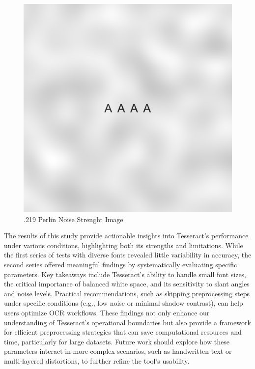 \documentclass[10pt,twocolumn]{article}
\begin{document}
\begin{figure}[h!]
    \centering
    \includegraphics[width=\linewidth]{Figures/Figure_I.png}
    \caption{.219 Perlin Noise Strenght Image}
    \label{fig:FigI}
\end{figure}
The results of this study provide actionable insights into Tesseract's performance under various conditions, highlighting both its strengths and limitations. While the first series of tests with diverse fonts revealed little variability in accuracy, the second series offered meaningful findings by systematically evaluating specific parameters. Key takeaways include Tesseract's ability to handle small font sizes, the critical importance of balanced white space, and its sensitivity to slant angles and noise levels. Practical recommendations, such as skipping preprocessing steps under specific conditions (e.g., low noise or minimal shadow contrast), can help users optimize OCR workflows. These findings not only enhance our understanding of Tesseract's operational boundaries but also provide a framework for efficient preprocessing strategies that can save computational resources and time, particularly for large datasets. Future work should explore how these parameters interact in more complex scenarios, such as handwritten text or multi-layered distortions, to further refine the tool’s usability.
\end{document}
